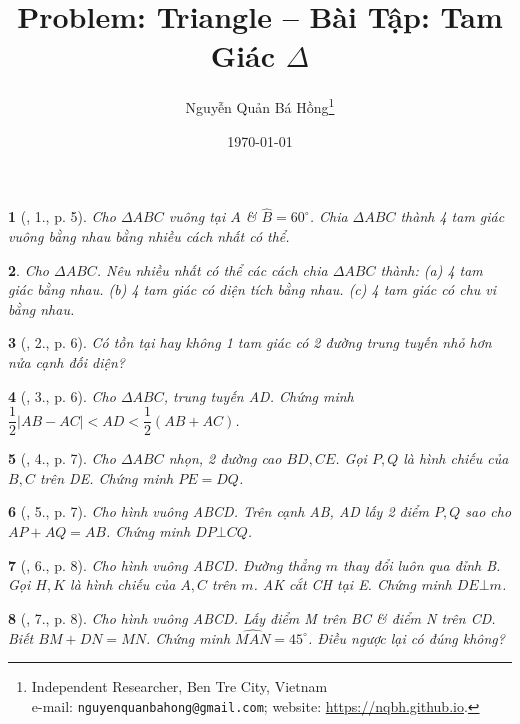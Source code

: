 \documentclass{article}
\title{Problem: Triangle -- Bài Tập: Tam Giác $\Delta$}
\author{Nguyễn Quản Bá Hồng\footnote{Independent Researcher, Ben Tre City, Vietnam\\e-mail: \texttt{nguyenquanbahong@gmail.com}; website: \url{https://nqbh.github.io}.}}
\date{\today}
\newtheorem{baitoan}{}%
\begin{document}
\maketitle


\begin{baitoan}[\cite{Dang2018}, 1., p. 5]
	 Cho $\Delta ABC$ vuông tại $A$ \& $\widehat{B} = 60^\circ$. Chia $\Delta ABC$ thành 4 tam giác vuông bằng nhau bằng nhiều cách nhất có thể.
\end{baitoan}

\begin{baitoan}
	Cho $\Delta ABC$. Nêu nhiều nhất có thể các cách chia $\Delta ABC$ thành: (a) 4 tam giác bằng nhau. (b) 4 tam giác có diện tích bằng nhau. (c) 4 tam giác có chu vi bằng nhau.
\end{baitoan}

\begin{baitoan}[\cite{Dang2018}, 2., p. 6]
	Có tồn tại hay không 1 tam giác có 2 đường trung tuyến nhỏ hơn nửa cạnh đối diện?
\end{baitoan}

\begin{baitoan}[\cite{Dang2018}, 3., p. 6]
	Cho $\Delta ABC$, trung tuyến AD. Chứng minh $\dfrac{1}{2}|AB - AC| < AD < \dfrac{1}{2}(AB + AC)$.
\end{baitoan}

\begin{baitoan}[\cite{Dang2018}, 4., p. 7]
	Cho $\Delta ABC$ nhọn, 2 đường cao $BD,CE$. Gọi $P,Q$ là hình chiếu của $B,C$ trên DE. Chứng minh $PE = DQ$.
\end{baitoan}

\begin{baitoan}[\cite{Dang2018}, 5., p. 7]
	Cho hình vuông ABCD. Trên cạnh AB, AD lấy 2 điểm $P,Q$ sao cho $AP + AQ = AB$. Chứng minh $DP\bot CQ$.
\end{baitoan}

\begin{baitoan}[\cite{Dang2018}, 6., p. 8]
	Cho hình vuông ABCD. Đường thẳng $m$ thay đổi luôn qua đỉnh B. Gọi $H,K$ là hình chiếu của $A,C$ trên $m$. AK cắt CH tại E. Chứng minh $DE\bot m$.
\end{baitoan}

\begin{baitoan}[\cite{Dang2018}, 7., p. 8]
	Cho hình vuông ABCD. Lấy điểm M trên BC \& điểm N trên CD. Biết $BM + DN = MN$. Chứng minh $\widehat{MAN} = 45^\circ$. Điều ngược lại có đúng không?
\end{baitoan}
\end{document}
